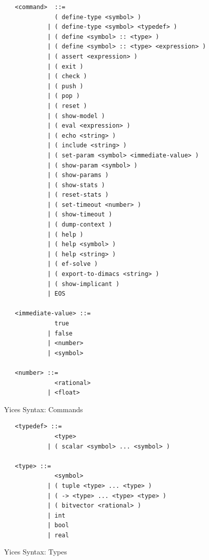 \documentclass[11pt,twoside,fleqn,openright,titlepage]{cslreport}
\begin{document}
\begin{figure}
\begin{small}
\begin{verbatim}
   <command>  ::=
              ( define-type <symbol> )
            | ( define-type <symbol> <typedef> )
            | ( define <symbol> :: <type> )
            | ( define <symbol> :: <type> <expression> )
            | ( assert <expression> )
            | ( exit )
            | ( check )
            | ( push )
            | ( pop )
            | ( reset )
            | ( show-model )
            | ( eval <expression> )
            | ( echo <string> )
            | ( include <string> )
            | ( set-param <symbol> <immediate-value> )
            | ( show-param <symbol> )
            | ( show-params )
            | ( show-stats )
            | ( reset-stats )
            | ( set-timeout <number> )
            | ( show-timeout )
            | ( dump-context )
            | ( help )
            | ( help <symbol> )
            | ( help <string> )
            | ( ef-solve )
            | ( export-to-dimacs <string> )
            | ( show-implicant )
            | EOS

   <immediate-value> ::=
              true
            | false
            | <number>
            | <symbol>

   <number> ::=
              <rational>
            | <float>
\end{verbatim}
\end{small}
\caption{Yices Syntax: Commands}
\label{syntax:commands}
\end{figure}

\begin{figure}
\begin{small}
\begin{verbatim}
   <typedef> ::=
              <type>
            | ( scalar <symbol> ... <symbol> )

   <type> ::=
              <symbol>
            | ( tuple <type> ... <type> )
            | ( -> <type> ... <type> <type> )
            | ( bitvector <rational> )
            | int
            | bool
            | real
\end{verbatim}
\end{small}
\caption{Yices Syntax: Types}
\label{syntax:types}
\end{figure}
\end{document}
